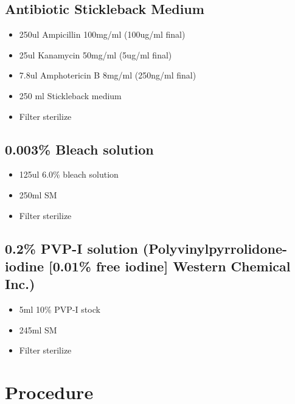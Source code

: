 \documentclass[
  letterpaper,
  DIV=11,
  numbers=noendperiod]{scrreprt}
\providecommand{\tightlist}{%
  \setlength{\itemsep}{0pt}\setlength{\parskip}{0pt}}\usepackage{longtable,booktabs,array}
\begin{document}
\hypertarget{antibiotic-stickleback-medium}{%
\subsection{Antibiotic Stickleback
Medium}\label{antibiotic-stickleback-medium}}

\begin{itemize}
\tightlist
\item
  250ul Ampicillin 100mg/ml (100ug/ml final)
\item
  25ul Kanamycin 50mg/ml (5ug/ml final)
\item
  7.8ul Amphotericin B 8mg/ml (250ng/ml final)
\item
  250 ml Stickleback medium
\item
  Filter sterilize
\end{itemize}

\hypertarget{bleach-solution}{%
\subsection{0.003\% Bleach solution}\label{bleach-solution}}

\begin{itemize}
\tightlist
\item
  125ul 6.0\% bleach solution
\item
  250ml SM
\item
  Filter sterilize
\end{itemize}

\hypertarget{pvp-i-solution-polyvinylpyrrolidone-iodine-0.01-free-iodine-western-chemical-inc.}{%
\subsection{0.2\% PVP-I solution (Polyvinylpyrrolidone-iodine {[}0.01\%
free iodine{]} Western Chemical
Inc.)}\label{pvp-i-solution-polyvinylpyrrolidone-iodine-0.01-free-iodine-western-chemical-inc.}}

\begin{itemize}
\tightlist
\item
  5ml 10\% PVP-I stock
\item
  245ml SM
\item
  Filter sterilize
\end{itemize}

\hypertarget{procedure-48}{%
\section{Procedure}\label{procedure-48}}
\end{document}
